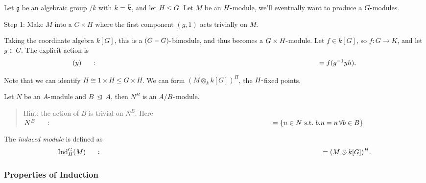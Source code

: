 Let \({\mathfrak{g}}\) be an algebraic group \(/k\) with
\(k = \mkern 1.5mu\overline{\mkern-1.5muk\mkern-1.5mu}\mkern 1.5mu\),
and let \(H \leq G\). Let \(M\) be an \(H{\hbox{-}}\)module, we'll
eventually want to produce a \(G{\hbox{-}}\)modules.

Step 1: Make \(M\) into a \(G\times H\) where the first component
\((g, 1)\) acts trivially on \(M\).

Taking the coordinate algebra \(k[G]\), this is a
\((G-G){\hbox{-}}\)bimodule, and thus becomes a
\(G\times H{\hbox{-}}\)module. Let \(f\in k[G]\), so \(f:G\to K\), and
let \(y\in G\). The explicit action is
\begin{align*}   [(g, h) f] (y) \mathrel{\vcenter{:}}= f(g^{-1} y h) .\end{align*}

Note that we can identify \(H\cong 1\times H \leq G\times H\). We can
form \((M\otimes_k k[G])^H\), the \(H{\hbox{-}}\)fixed points.

\begin{exercise}

\begin{exercise}

Let \(N\) be an \(A{\hbox{-}}\)module and \(B{~\trianglelefteq~}A\),
then \(N^B\) is an \(A/B{\hbox{-}}\)module.

\begin{quote}
Hint: the action of \(B\) is trivial on \(N^B\). Here
\(N^B \mathrel{\vcenter{:}}=\left\{{n\in N ~{\text{s.t.}}~b.n = n\, \forall b\in B}\right\}\)
\end{quote}

\end{exercise}

\end{exercise}

\begin{definition}[Induction]

\begin{definition}[Induction]

The \emph{induced module} is defined as
\begin{align*}   \operatorname{Ind}_H^G(M) \mathrel{\vcenter{:}}=(M\otimes k[G])^H .\end{align*}

\end{definition}

\end{definition}

\hypertarget{properties-of-induction}{%
\subsubsection{Properties of Induction}\label{properties-of-induction}}

